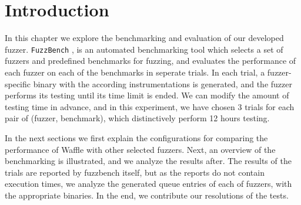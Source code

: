 \section{Introduction}
\label{sec:ch4-intro}


In this chapter we explore the benchmarking and evaluation of our developed fuzzer. \texttt{FuzzBench} \cite{metzman2020fuzzbench}, is an automated benchmarking tool which selects a set of fuzzers and predefined benchmarks for fuzzing, and evaluates the performance of each fuzzer on each of the benchmarks in seperate trials. In each trial, a fuzzer-specific binary with the according instrumentations is generated, and the fuzzer performs its testing until its time limit is ended. We can modify the amount of testing time in advance, and in this experiment, we have chosen 3 trials for each pair of (fuzzer, benchmark), which distinctively perform 12 hours testing.

In the next sections we first explain the configurations for comparing the performance of Waffle with other selected fuzzers. Next, an overview of the benchmarking is illustrated, and we analyze the results after. The results of the trials are reported by fuzzbench itself, but as the reports do not contain execution times, we analyze the generated queue entries of each of fuzzers, with the appropriate binaries. In the end, we contribute our resolutions of the tests.